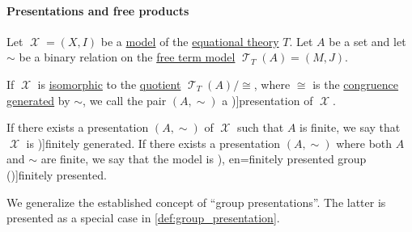 \paragraph{Presentations and free products}

\begin{definition}\label{def:fol_model_presentation}\mimprovised
  Let \( \mscrX = (X, I) \) be a \hyperref[def:fol_theory/model]{model} of the \hyperref[def:fol_equational_theory]{equational theory} \( T \). Let \( A \) be a set and let \( {\sim} \) be a binary relation on the \hyperref[def:fol_free_term_model]{free term model} \( \mscrT_T(A) = (M, J) \).

  If \( \mscrX \) is \hyperref[def:fol_isomorphism]{isomorphic} to the \hyperref[def:fol_quotient_structure]{quotient} \( \mscrT_T(A) / {\cong} \), where \( {\cong} \) is the \hyperref[def:fol_congruence]{congruence} \hyperref[def:fol_generated_congruence]{generated} by \( {\sim} \), we call the pair \( (A, {\sim}) \) a \term[en=group presentation (\cite[90]{Bourbaki1998Algebra1to3})]{presentation} of \( \mscrX \).

  \begin{thmenum}
     If there exists a presentation \( (A, {\sim}) \) of \( \mscrX \) such that \( A \) is finite, we say that \( \mscrX \) is \term[en=finitely generated group (\cite[90]{Bourbaki1998Algebra1to3})]{finitely generated}. If there exists a presentation \( (A, \sim) \) where both \( A \) and \( {\sim} \) are finite, we say that the model is \term[ru=конечно определённая группа (\cite[43]{Кострикин2020АлгебраЧасть3}), en=finitely presented group (\cite[90]{Bourbaki1998Algebra1to3})]{finitely presented}.
  \end{thmenum}
\end{definition}
\begin{comments}
  \item We generalize the established concept of \enquote{group presentations}. The latter is presented as a special case in \cref{def:group_presentation}.
\end{comments}

